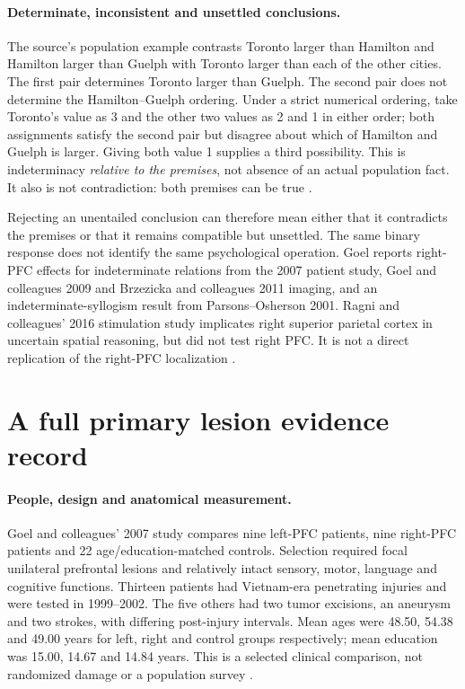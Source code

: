 \paragraph{Determinate, inconsistent and unsettled conclusions.}
The source's population example contrasts Toronto larger than Hamilton
and Hamilton larger than Guelph with Toronto larger than each of the
other cities. The first pair determines Toronto larger than Guelph. The
second pair does not determine the Hamilton--Guelph ordering. Under a
strict numerical ordering, take Toronto's value as 3 and the other two
values as 2 and 1 in either order; both assignments satisfy the second
pair but disagree about which of Hamilton and Guelph is larger. Giving
both value 1 supplies a third possibility. This is indeterminacy
\emph{relative to the premises}, not absence of an actual population fact.
It also is not contradiction: both premises can be true
\cite[p.~122]{Goel2021RationalityBrain}.

Rejecting an unentailed conclusion can therefore mean either that it
contradicts the premises or that it remains compatible but unsettled.
The same binary response does not identify the same psychological
operation. Goel reports right-PFC effects for indeterminate relations
from the 2007 patient study, Goel and colleagues 2009 and Brzezicka and
colleagues 2011 imaging, and an indeterminate-syllogism result from
Parsons--Osherson 2001. Ragni and colleagues' 2016 stimulation study
implicates right superior parietal cortex in uncertain spatial reasoning,
but did not test right PFC. It is not a direct replication of the
right-PFC localization \cite[p.~122]{Goel2021RationalityBrain}.

\section{A full primary lesion evidence record}
\label{sec:p19-r14-lesion-record}

\paragraph{People, design and anatomical measurement.}
Goel and colleagues' 2007 study compares nine left-PFC patients, nine
right-PFC patients and 22 age/education-matched controls. Selection
required focal unilateral prefrontal lesions and relatively intact
sensory, motor, language and cognitive functions. Thirteen patients had
Vietnam-era penetrating injuries and were tested in 1999--2002. The five
others had two tumor excisions, an aneurysm and two strokes, with differing
post-injury intervals. Mean ages were 48.50, 54.38 and 49.00 years for
left, right and control groups respectively; mean education was 15.00,
14.67 and 14.84 years. This is a selected clinical comparison, not
randomized damage or a population survey
\cite[pp.~2245--2247, table~1]{GoelEtAl2007CertainUncertain}.

